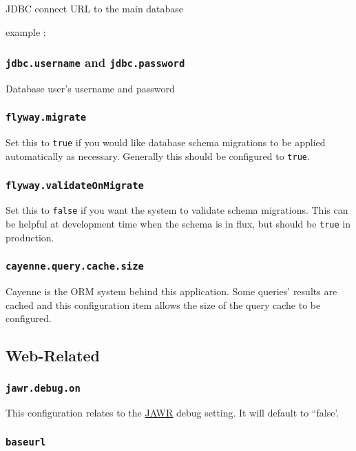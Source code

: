 JDBC connect URL to the main database

example : 

\subsubsection{{\tt jdbc.username} and {\tt jdbc.password}}

Database user's username and password

\subsubsection{\tt flyway.migrate}

Set this to {\tt true} if you would like database schema migrations to be applied automatically as necessary.  Generally this should be configured to {\tt true}.

\subsubsection{\tt flyway.validateOnMigrate}

Set this to {\tt false} if you want the system to validate schema migrations.  This can be helpful at development time when the schema is in flux, but should be {\tt true} in production.

\subsubsection{\tt cayenne.query.cache.size}

Cayenne is the ORM system behind this application.  Some queries' results are cached and this configuration item allows the size of the query cache to be configured.

\subsection{Web-Related}

\subsubsection{\tt jawr.debug.on}

This configuration relates to the \href{https://jawr.java.net/}{JAWR} debug setting.  It will default to ``false'.

\subsubsection{\tt baseurl}

